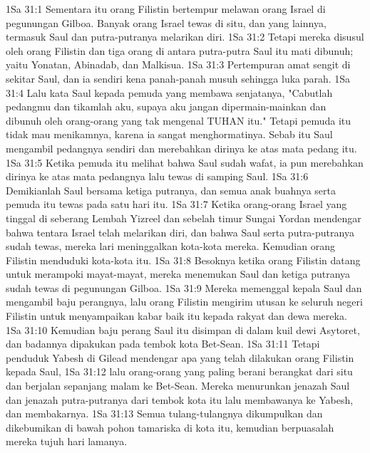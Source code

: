 1Sa 31:1  Sementara itu orang Filistin bertempur melawan orang Israel di pegunungan Gilboa. Banyak orang Israel tewas di situ, dan yang lainnya, termasuk Saul dan putra-putranya melarikan diri.
1Sa 31:2  Tetapi mereka disusul oleh orang Filistin dan tiga orang di antara putra-putra Saul itu mati dibunuh; yaitu Yonatan, Abinadab, dan Malkisua.
1Sa 31:3  Pertempuran amat sengit di sekitar Saul, dan ia sendiri kena panah-panah musuh sehingga luka parah.
1Sa 31:4  Lalu kata Saul kepada pemuda yang membawa senjatanya, "Cabutlah pedangmu dan tikamlah aku, supaya aku jangan dipermain-mainkan dan dibunuh oleh orang-orang yang tak mengenal TUHAN itu." Tetapi pemuda itu tidak mau menikamnya, karena ia sangat menghormatinya. Sebab itu Saul mengambil pedangnya sendiri dan merebahkan dirinya ke atas mata pedang itu.
1Sa 31:5  Ketika pemuda itu melihat bahwa Saul sudah wafat, ia pun merebahkan dirinya ke atas mata pedangnya lalu tewas di samping Saul.
1Sa 31:6  Demikianlah Saul bersama ketiga putranya, dan semua anak buahnya serta pemuda itu tewas pada satu hari itu.
1Sa 31:7  Ketika orang-orang Israel yang tinggal di seberang Lembah Yizreel dan sebelah timur Sungai Yordan mendengar bahwa tentara Israel telah melarikan diri, dan bahwa Saul serta putra-putranya sudah tewas, mereka lari meninggalkan kota-kota mereka. Kemudian orang Filistin menduduki kota-kota itu.
1Sa 31:8  Besoknya ketika orang Filistin datang untuk merampoki mayat-mayat, mereka menemukan Saul dan ketiga putranya sudah tewas di pegunungan Gilboa.
1Sa 31:9  Mereka memenggal kepala Saul dan mengambil baju perangnya, lalu orang Filistin mengirim utusan ke seluruh negeri Filistin untuk menyampaikan kabar baik itu kepada rakyat dan dewa mereka.
1Sa 31:10  Kemudian baju perang Saul itu disimpan di dalam kuil dewi Asytoret, dan badannya dipakukan pada tembok kota Bet-Sean.
1Sa 31:11  Tetapi penduduk Yabesh di Gilead mendengar apa yang telah dilakukan orang Filistin kepada Saul,
1Sa 31:12  lalu orang-orang yang paling berani berangkat dari situ dan berjalan sepanjang malam ke Bet-Sean. Mereka menurunkan jenazah Saul dan jenazah putra-putranya dari tembok kota itu lalu membawanya ke Yabesh, dan membakarnya.
1Sa 31:13  Semua tulang-tulangnya dikumpulkan dan dikebumikan di bawah pohon tamariska di kota itu, kemudian berpuasalah mereka tujuh hari lamanya.


